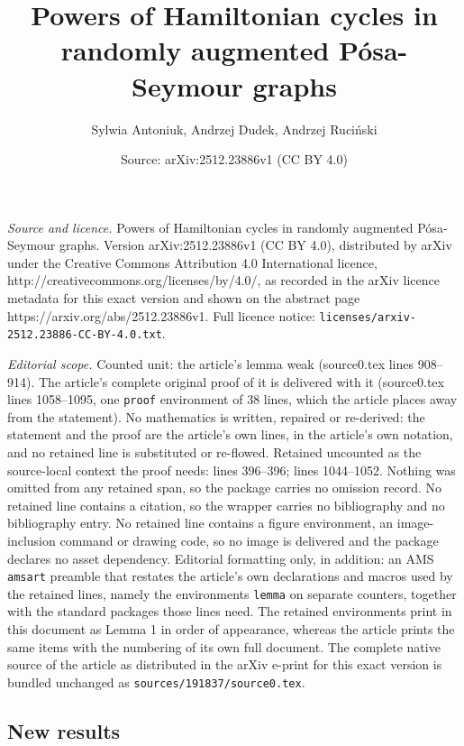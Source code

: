 \documentclass[10pt,a4paper]{amsart}
\title{Powers of Hamiltonian cycles in randomly augmented P\'osa-Seymour graphs}
\author{Sylwia Antoniuk, Andrzej Dudek, Andrzej Ruci\'nski}
\date{Source: arXiv:2512.23886v1 (CC BY 4.0)}
\begin{document}
\maketitle

\noindent\emph{Source and licence.} Powers of Hamiltonian cycles in randomly augmented P\'osa-Seymour graphs. Version arXiv:2512.23886v1 (CC BY 4.0), distributed by arXiv under the Creative Commons Attribution 4.0 International licence, http://creativecommons.org/licenses/by/4.0/, as recorded in the arXiv licence metadata for this exact version and shown on the abstract page https://arxiv.org/abs/2512.23886v1. Full licence notice: \texttt{licenses/arxiv-2512.23886-CC-BY-4.0.txt}.\par\smallskip

\noindent\textit{Editorial scope.} Counted unit: the article's lemma weak (source0.tex lines 908--914). The article's complete original proof of it is delivered with it (source0.tex lines 1058--1095, one \texttt{proof} environment of 38 lines, which the article places away from the statement). No mathematics is written, repaired or re-derived: the statement and the proof are the article's own lines, in the article's own notation, and no retained line is substituted or re-flowed.  Retained uncounted as the source-local context the proof needs: lines 396--396; lines 1044--1052.  Nothing was omitted from any retained span, so the package carries no omission record.  No retained line contains a citation, so the wrapper carries no bibliography and no bibliography entry.  No retained line contains a figure environment, an image-inclusion command or drawing code, so no image is delivered and the package declares no asset dependency.  Editorial formatting only, in addition: an AMS \texttt{amsart} preamble that restates the article's own declarations and macros used by the retained lines, namely the environments \texttt{lemma} on separate counters, together with the standard packages those lines need.  The retained environments print in this document as Lemma 1 in order of appearance, whereas the article prints the same items with the numbering of its own full document.  The complete native source of the article as distributed in the arXiv e-print for this exact version is bundled unchanged as \texttt{sources/191837/source0.tex}.
\subsection{New results}\label{newres}
\end{document}
